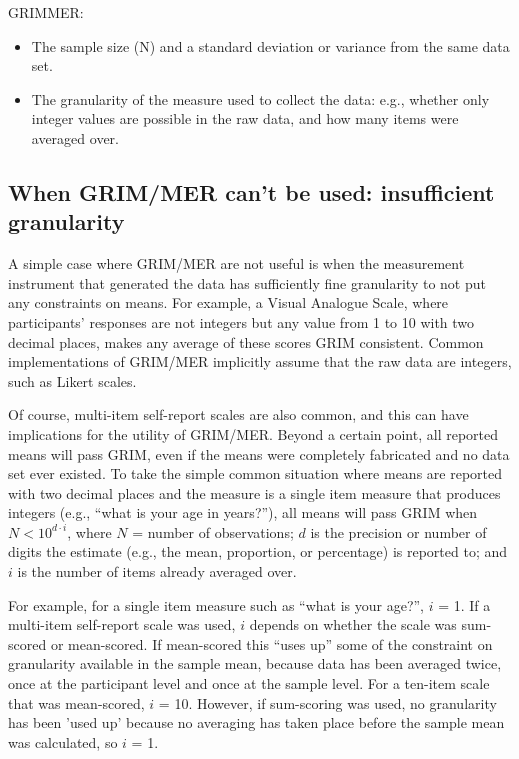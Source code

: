 \documentclass[letterpaper, 12pt]{article}
\begin{document}
{GRIMMER:
  \begin{itemize}
      \item The sample size (N) and a standard deviation or variance from the same data set.
      \item The granularity of the measure used to collect the data: e.g., whether only integer values are possible in the raw data, and how many items were averaged over.
  \end{itemize}

\subsection*{When GRIM/MER can't be used: insufficient granularity}

A simple case where GRIM/MER are not useful is when the measurement instrument that generated the data has sufficiently fine granularity to not put any constraints on means. For example, a Visual Analogue Scale, where participants' responses are not integers but any value from 1 to 10 with two decimal places, makes any average of these scores GRIM consistent. Common implementations of GRIM/MER implicitly assume that the raw data are integers, such as Likert scales. 

Of course, multi-item self-report scales are also common, and this can have implications for the utility of GRIM/MER. Beyond a certain point, all reported means will pass GRIM, even if the means were completely fabricated and no data set ever existed. To take the simple common situation where means are reported with two decimal places and the measure is a single item measure that produces integers (e.g., ``what is your age in years?''), all means will pass GRIM when $N < 10^{d \cdot i}$,
where $N$ = number of observations; $d$ is the precision or number of digits the estimate (e.g., the mean, proportion, or percentage) is reported to; and $i$ is the number of items already averaged over. 

For example, for a single item measure such as ``what is your age?'', $i$ = 1. If a multi-item self-report scale was used, $i$ depends on whether the scale was sum-scored or mean-scored. If mean-scored this ``uses up'' some of the constraint on granularity available in the sample mean, because data has been averaged twice, once at the participant level and once at the sample level. For a ten-item scale that was mean-scored, $i$ = 10. However, if sum-scoring was used, no granularity has been 'used up' because no averaging has taken place before the sample mean was calculated, so $i$ = 1. 

}
\end{document}
